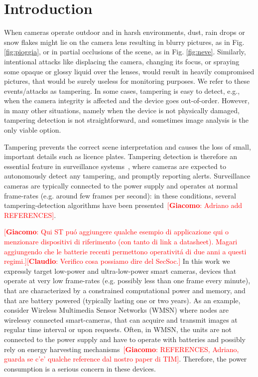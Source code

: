 \documentclass{llncs}
\newcommand{\gi}[1]{{\textcolor{red}{[\small \textbf{Giacomo}: #1]}}}
\newcommand{\cl}[1]{{\textcolor{red}{[\small \textbf{Claudio}: #1]}}}
\begin{document}
\section{Introduction}\label{sec:introduction}


When cameras operate outdoor and in harsh environments, dust, rain drops or snow flakes might lie on the camera lens resulting in blurry pictures, as in Fig. \ref{fig:pioggia}, or in partial occlusions of the scene, as in Fig. \ref{fig:neve}. Similarly, intentional attacks like displacing the camera, changing its focus, or spraying some opaque or glossy liquid over the lenses, would result in heavily compromised pictures, that would be surely useless for monitoring purposes. We refer to these events/attacks as tampering. In some cases, tampering is easy to detect, e.g., when the camera integrity is affected and the device goes out-of-order. However, in many other situations, namely when the device is not physically damaged, tampering detection is not straightforward, and sometimes image analysis is the only viable option. 

Tampering prevents the correct scene interpretation and causes the loss of small, important details such as licence plates. Tampering detection is therefore an essential feature in surveillance systems~\cite{hampapur2005smart}, where cameras are expected to autonomously detect any tampering, and promptly reporting alerts. Surveillance cameras are typically connected to the power supply and operates at normal frame-rates (e.g. around few frames per second): in these conditions, several tampering-detection algorithms have been presented~\gi{Adriano add REFERENCES}.  

\gi{Qui ST pu\'o aggiungere qualche esempio di applicazione qui o menzionare dispositivi di riferimento (con tanto di link a datasheet). Magari aggiungendo che le batterie recenti permettono operativit\'a di due anni a questi regimi.}\cl{Verifico cosa possiamo dire del SecSoc.}
%
In this work we expressly target low-power and ultra-low-power smart cameras, devices that operate at very low frame-rates (e.g. possibly less than one frame every minute), that are characterized by a constrained computational power and memory, and that are battery powered (typically lasting one or two years). As an example, consider Wireless Multimedia Sensor Networks (WMSN) \cite{akyildiz2007survey} where nodes are wirelessy connected smart-cameras, that can acquire and transmit images at regular time interval or upon requests. Often, in WMSN, the units are not connected to the power supply and have to operate with batteries and possibly rely on energy harvesting mechanisms~\gi{REFERENCES, Adriano, guarda se c'e' qualche reference dal nostro paper di TIM}. Therefore, the power consumption is a serious concern in these devices.
\end{document}
